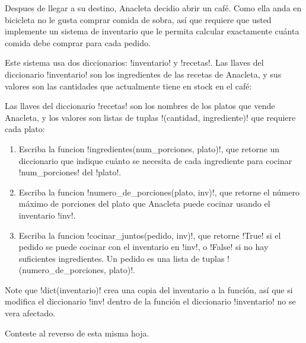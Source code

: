 Despues de llegar a su destino,
Anacleta decidio abrir un café.
Como ella anda en bicicleta
no le gusta comprar comida de sobra,
así que requiere que usted implemente un sistema de inventario
que le permita calcular exactamente
cuánta comida debe comprar para cada pedido.

Este sistema usa dos diccionarios: \li!inventario! y \li!recetas!.
Las llaves del diccionario \li!inventario!
son los ingredientes de las recetas de Anacleta,
y sus valores son las cantidades que actualmente tiene en stock en el café:


Las llaves del diccionario \li!recetas!
son los nombres de los platos que vende Anacleta,
y los valores son listas de tuplas \li!(cantidad, ingrediente)!
que requiere cada plato:


\begin{enumerate}[leftmargin=0pt,label=\emph{\alph*})]

  \item
    Escriba la funcion \li!ingredientes(num_porciones, plato)!,
    que retorne un diccionario que indique
    cuánto se necesita de cada ingrediente
    para cocinar \li!num_porciones! del \li!plato!.
    

  \item
    Escriba la funcion \li!numero_de_porciones(plato, inv)!,
    que retorne el número máximo de porciones del plato
    que Anacleta puede cocinar usando el inventario \li!inv!.
    

  \item
    Escriba la funcion \li!cocinar_juntos(pedido, inv)!,
    que retorne \li!True! si el pedido se puede cocinar
    con el inventario en \li!inv!,
    o \li!False! si no hay suficientes ingredientes.
    Un pedido es una lista de tuplas \li!(numero_de_porciones, plato)!.
    

\end{enumerate}

Note que \li!dict(inventario)! crea
una copia del inventario a la función,
así que si modifica el diccionario \li!inv! dentro de la función
el diccionario \li!inventario! no se vera afectado.

Conteste al reverso de esta misma hoja.

